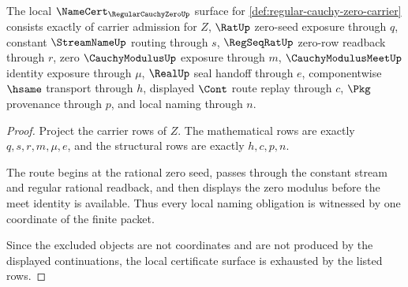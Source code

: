 \begin{theorem}
\label{thm:regular-cauchy-zero-namecert-obligations}
The local $\NameCert_{\RegularCauchyZeroUp}$ surface for \autoref{def:regular-cauchy-zero-carrier} consists exactly of carrier admission for $Z$, $\RatUp$ zero-seed exposure through $q$, constant $\StreamNameUp$ routing through $s$, $\RegSeqRatUp$ zero-row readback through $r$, zero $\CauchyModulusUp$ exposure through $m$, $\CauchyModulusMeetUp$ identity exposure through $\mu$, $\RealUp$ seal handoff through $e$, componentwise $\hsame$ transport through $h$, displayed $\Cont$ route replay through $c$, $\Pkg$ provenance through $p$, and local naming through $n$.
\end{theorem}
\begin{proof}
Project the carrier rows of $Z$. The mathematical rows are exactly $q,s,r,m,\mu,e$, and the structural rows are exactly $h,c,p,n$.

The route begins at the rational zero seed, passes through the constant stream and regular rational readback, and then displays the zero modulus before the meet identity is available. Thus every local naming obligation is witnessed by one coordinate of the finite packet.

Since the excluded objects are not coordinates and are not produced by the displayed continuations, the local certificate surface is exhausted by the listed rows.
\end{proof}

